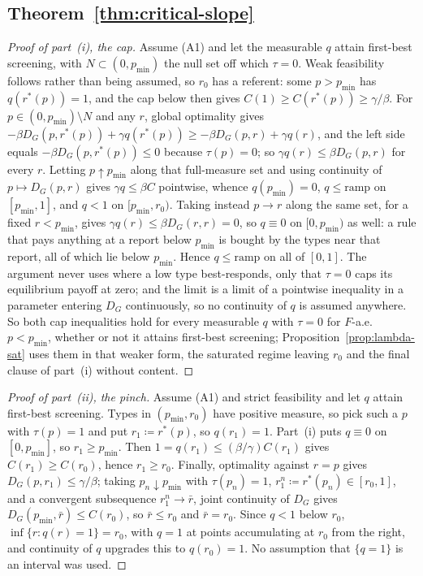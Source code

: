 \documentclass[acmsmall,nonacm,screen]{acmart}
\theoremstyle{acmplain}%
\theoremstyle{acmdefinition}%
\numberwithin{equation}{section}
\begin{document}
\begin{appendix}
\subsection{Theorem~\ref{thm:critical-slope}}\label{app:critical-slope}

\begin{proof}[Proof of part~(i), the cap]
Assume (A1) and let the measurable $q$ attain first-best screening, with $N\subset(0,p_{\min})$ the null set off which $\tau=0$. Weak feasibility follows rather than being assumed, so $r_0$ has a referent: some $p>p_{\min}$ has $q(r^*(p))=1$, and the cap below then gives $C(1)\geq C(r^*(p))\geq\gamma/\beta$. For $p\in(0,p_{\min})\setminus N$ and any $r$, global optimality gives $-\beta D_G(p,r^*(p))+\gamma q(r^*(p))\geq-\beta D_G(p,r)+\gamma q(r)$, and the left side equals $-\beta D_G(p,r^*(p))\leq0$ because $\tau(p)=0$; so $\gamma q(r)\leq\beta D_G(p,r)$ for every $r$. Letting $p\uparrow p_{\min}$ along that full-measure set and using continuity of $p\mapsto D_G(p,r)$ gives $\gamma q\leq\beta C$ pointwise, whence $q(p_{\min})=0$, $q\leq\mathrm{ramp}$ on $[p_{\min},1]$, and $q<1$ on $[p_{\min},r_0)$. Taking instead $p\to r$ along the same set, for a fixed $r<p_{\min}$, gives $\gamma q(r)\leq\beta D_G(r,r)=0$, so $q\equiv0$ on $[0,p_{\min})$ as well: a rule that pays anything at a report below $p_{\min}$ is bought by the types near that report, all of which lie below $p_{\min}$. Hence $q\leq\mathrm{ramp}$ on all of $[0,1]$. The argument never uses where a low type best-responds, only that $\tau=0$ caps its equilibrium payoff at zero; and the limit is a limit of a pointwise inequality in a parameter entering $D_G$ continuously, so no continuity of $q$ is assumed anywhere. So both cap inequalities hold for every measurable $q$ with $\tau=0$ for $F$-a.e. $p<p_{\min}$, whether or not it attains first-best screening; Proposition~\ref{prop:lambda-sat} uses them in that weaker form, the saturated regime leaving $r_0$ and the final clause of part~(i) without content.
\end{proof}

\begin{proof}[Proof of part~(ii), the pinch]
Assume (A1) and strict feasibility and let $q$ attain first-best screening. Types in $(p_{\min},r_0)$ have positive measure, so pick such a $p$ with $\tau(p)=1$ and put $r_1\coloneqq r^*(p)$, so $q(r_1)=1$. Part~(i) puts $q\equiv0$ on $[0,p_{\min}]$, so $r_1\geq p_{\min}$. Then $1=q(r_1)\leq(\beta/\gamma)C(r_1)$ gives $C(r_1)\geq C(r_0)$, hence $r_1\geq r_0$. Finally, optimality against $r=p$ gives $D_G(p,r_1)\leq\gamma/\beta$; taking $p_n\downarrow p_{\min}$ with $\tau(p_n)=1$, $r_1^n\coloneqq r^*(p_n)\in[r_0,1]$, and a convergent subsequence $r_1^n\to\bar r$, joint continuity of $D_G$ gives $D_G(p_{\min},\bar r)\leq C(r_0)$, so $\bar r\leq r_0$ and $\bar r=r_0$. Since $q<1$ below $r_0$, $\inf\{r:q(r)=1\}=r_0$, with $q=1$ at points accumulating at $r_0$ from the right, and continuity of $q$ upgrades this to $q(r_0)=1$. No assumption that $\{q=1\}$ is an interval was used.
\end{proof}


\end{appendix}
\end{document}
